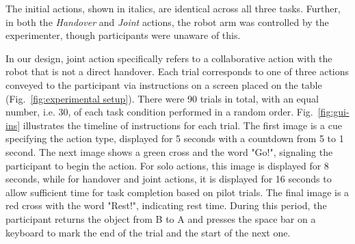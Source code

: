 \noindent The initial actions, shown in italics, are identical across all three tasks. Further, in both the \emph{Handover} and \emph{Joint} actions, the robot arm was controlled by the experimenter, though participants were unaware of this. 

In our design, joint action specifically refers to a collaborative action with the robot that is not a direct handover.
Each trial corresponds to one of three actions conveyed to the participant via instructions on a screen placed on the table (Fig.~\ref{fig:experimental setup}). There were 90 trials in total, with an equal number, i.e. 30, of each task condition performed in a random order. Fig.~\ref{fig:gui-ins} illustrates the timeline of instructions for each trial. The first image is a cue specifying the action type, displayed for 5 seconds with a countdown from 5 to 1 second. The next image shows a green cross and the word "Go!", signaling the participant to begin the action. For solo actions, this image is displayed for 8 seconds, while for handover and joint actions, it is displayed for 16 seconds to allow sufficient time for task completion based on pilot trials. The final image is a red cross with the word "Rest!", indicating rest time. During this period, the participant returns the object from B to A and presses the space bar on a keyboard to mark the end of the trial and the start of the next one.